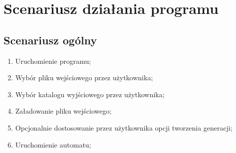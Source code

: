 \documentclass[a4paper,12pt]{article}
\begin{document}
\section{Scenariusz działania programu}
\subsection{Scenariusz ogólny}
\begin{enumerate}
\item Uruchomienie programu;
\item Wybór pliku wejściowego przez użytkownika;
\item Wybór katalogu wyjściowego przez użytkownika;
\item Załadowanie pliku wejściowego;
\item Opcjonalnie dostosowanie przez użytkownika opcji tworzenia generacji;
\item Uruchomienie automatu;
\end{enumerate}
\end{document}
